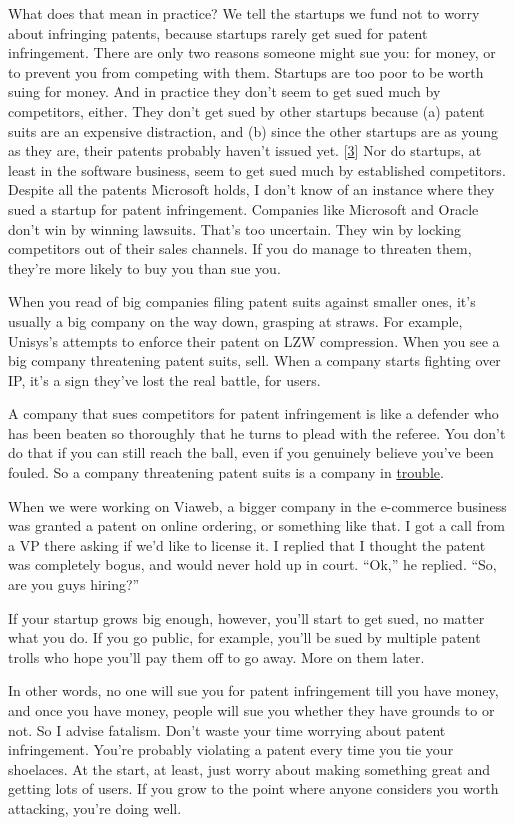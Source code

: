 What does that mean in practice? We tell the startups we fund not to
worry about infringing patents, because startups rarely get sued for
patent infringement. There are only two reasons someone might sue you:
for money, or to prevent you from competing with them. Startups are too
poor to be worth suing for money. And in practice they don't seem to get
sued much by competitors, either. They don't get sued by other startups
because (a) patent suits are an expensive distraction, and (b) since the
other startups are as young as they are, their patents probably haven't
issued yet. {[}\hyperref[f3n]{3}{]} Nor do startups, at least in the
software business, seem to get sued much by established competitors.
Despite all the patents Microsoft holds, I don't know of an instance
where they sued a startup for patent infringement. Companies like
Microsoft and Oracle don't win by winning lawsuits. That's too
uncertain. They win by locking competitors out of their sales channels.
If you do manage to threaten them, they're more likely to buy you than
sue you.

When you read of big companies filing patent suits against smaller ones,
it's usually a big company on the way down, grasping at straws. For
example, Unisys's attempts to enforce their patent on LZW compression.
When you see a big company threatening patent suits, sell. When a
company starts fighting over IP, it's a sign they've lost the real
battle, for users.

A company that sues competitors for patent infringement is like a
defender who has been beaten so thoroughly that he turns to plead with
the referee. You don't do that if you can still reach the ball, even if
you genuinely believe you've been fouled. So a company threatening
patent suits is a company in
\href{http://www.theregister.co.uk/2006/03/15/azul_sues_sun/}{trouble}.

When we were working on Viaweb, a bigger company in the e-commerce
business was granted a patent on online ordering, or something like
that. I got a call from a VP there asking if we'd like to license it. I
replied that I thought the patent was completely bogus, and would never
hold up in court. ``Ok,'' he replied. ``So, are you guys hiring?''

If your startup grows big enough, however, you'll start to get sued, no
matter what you do. If you go public, for example, you'll be sued by
multiple patent trolls who hope you'll pay them off to go away. More on
them later.

In other words, no one will sue you for patent infringement till you
have money, and once you have money, people will sue you whether they
have grounds to or not. So I advise fatalism. Don't waste your time
worrying about patent infringement. You're probably violating a patent
every time you tie your shoelaces. At the start, at least, just worry
about making something great and getting lots of users. If you grow to
the point where anyone considers you worth attacking, you're doing well.

